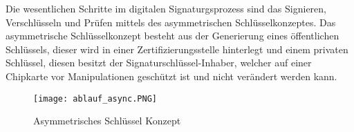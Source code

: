 Die wesentlichen Schritte im digitalen Signaturgsprozess sind das Signieren, Verschlüsseln und Prüfen mittels des asymmetrischen Schlüsselkonzeptes. Das asymmetrische Schlüsselkonzept besteht aus der Generierung eines öffentlichen Schlüssels, dieser wird in einer Zertifizierungsstelle hinterlegt und einem privaten Schlüssel, diesen besitzt der Signaturschlüssel-Inhaber, welcher auf einer Chipkarte vor Manipulationen geschützt ist und nicht verändert werden kann. \cite{techno1} 
\begin{figure}[!ht]
    \centering
    \texttt{[image: ablauf\_async.PNG]}
    \caption[Asymmetrisches Schlüsselkonzept]{\small{Asymmetrisches Schlüssel Konzept \cite{techno5}}}
\end{figure}